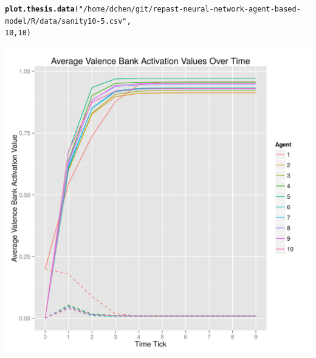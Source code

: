 \documentclass{article}\usepackage[]{graphicx}\usepackage[]{color}
\makeatletter
\def\maxwidth{ %
  \ifdim\Gin@nat@width>\linewidth
    \linewidth
  \else
    \Gin@nat@width
  \fi
}
\newcommand{\hlnum}[1]{\textcolor[rgb]{0.686,0.059,0.569}{#1}}%
\newcommand{\hlstr}[1]{\textcolor[rgb]{0.192,0.494,0.8}{#1}}%
\newcommand{\hlstd}[1]{\textcolor[rgb]{0.345,0.345,0.345}{#1}}%
\newcommand{\hlkwd}[1]{\textcolor[rgb]{0.737,0.353,0.396}{\textbf{#1}}}%
\newenvironment{kframe}{%
 \def\at@end@of@kframe{}%
 \ifinner\ifhmode%
  \def\at@end@of@kframe{\end{minipage}}%
  \begin{minipage}{\columnwidth}%
 \fi\fi%
 \def\FrameCommand##1{\hskip\@totalleftmargin \hskip-\fboxsep
 \colorbox{shadecolor}{##1}\hskip-\fboxsep
     \hskip-\linewidth \hskip-\@totalleftmargin \hskip\columnwidth}%
 \MakeFramed {\advance\hsize-\width
   \@totalleftmargin\z@ \linewidth\hsize
   \@setminipage}}%
 {\par\unskip\endMakeFramed%
 \at@end@of@kframe}
\newenvironment{knitrout}{}{} %
\makeatother
\begin{document}
\newpage
\begin{knitrout}
\color{fgcolor}\begin{kframe}
\begin{alltt}
\hlkwd{plot.thesis.data}\hlstd{(}\hlstr{"/home/dchen/git/repast-neural-network-agent-based-model/R/data/sanity10-5.csv"}\hlstd{,}
    \hlnum{10}\hlstd{,} \hlnum{10}\hlstd{)}
\end{alltt}
\end{kframe}
\includegraphics[width=\maxwidth]{figure/unnamed-chunk-5} 

\end{knitrout}
\end{document}
